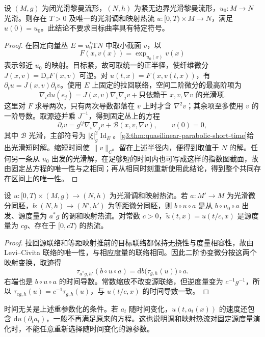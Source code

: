 \begin{corollary}\label{g3:cor:harmonic-heat-short-time}
	设 \((M,g)\) 为闭光滑黎曼流形，\((N,h)\) 为紧无边界光滑黎曼流形，\(u_0:M\to N\) 光滑。则存在 \(T>0\) 及唯一的光滑调和映射热流 \(u:[0,T)\times M\to N\)，满足 \(u(0)=u_0\)。此结论不要求目标曲率具有特定符号。
\end{corollary}
\begin{proof}
	在固定向量丛 \(E=u_0^*\mathrm TN\) 中取小截面 \(v\)，以
	\[
		F(x,v(x))=\exp_{u_0(x)}v(x)
	\]
	表示邻近 \(u_0\) 的映射。目标紧，故可取统一的正半径，使纤维微分 \(J(x,v)=\mathrm D_vF(x,v)\) 可逆。对 \(u(t,x)=F(x,v(t,x))\)，有 \(\partial_tu=J(x,v)\partial_tv\)。使用 \(E\) 上固定的拉回联络，空间二阶微分的最高阶项为
	\[
		\nabla_i\mathrm du(e_j)=J(x,v)\nabla_i\nabla_jv
		+\text{只依赖于 }x,v,\nabla v\text{ 的光滑项}.
	\]
	这里对 \(F\) 求导两次，只有两次导数都落在 \(v\) 上时才含 \(\nabla^2v\)；其余项至多使用 \(v\) 的一阶导数。取源迹并乘 \(J^{-1}\)，得到固定丛上的方程
	\[
		\partial_tv=g^{ij}\nabla_i\nabla_jv+\mathcal B(x,v,\nabla v),
		\qquad v(0)=0,
	\]
	其中 \(\mathcal B\) 光滑，主部符号为 \(|\xi|_g^2\operatorname{Id}_E\)。\cref{g3:thm:quasilinear-parabolic-short-time}给出光滑短时解。缩短时间使 \(\|v\|_{C^0}\) 留在上述半径内，便得到取值于 \(N\) 的解。任何另一条从 \(u_0\) 出发的光滑解，在足够短的时间内也可写成这样的指数图截面，故由固定丛方程的唯一性与之相同；再从相同时刻重新使用此结论，得到整个共同存在区间上的唯一性。
\end{proof}

\begin{proposition}\label{g3:prop:harmonic-heat-naturality}
	设 \(u:[0,T)\times(M,g)\to(N,h)\) 为光滑调和映射热流。若 \(a:M'\to M\) 为光滑微分同胚，\(b:(N,h)\to(N',h')\) 为等距微分同胚，则 \(b\circ u\circ a\) 是从 \(b\circ u_0\circ a\) 出发、源度量为 \(a^*g\) 的调和映射热流。对常数 \(c>0\)，\(\widetilde u(t,x)=u(t/c,x)\) 是源度量为 \(cg\)、存在于 \([0,cT)\) 的热流。
\end{proposition}
\begin{proof}
	拉回源联络和等距映射推前的目标联络都保持无挠性与度量相容性，故由 Levi--Civita 联络的唯一性，与相应度量的联络相同。因此二阶协变微分按这两个映射变换，取迹得
	\[
		\tau_{a^*g,h'}(b\circ u\circ a)
		=\mathrm db\bigl(\tau_{g,h}(u)\bigr)\circ a.
	\]
	右端也是 \(b\circ u\circ a\) 的时间导数。常数缩放不改变源联络，但逆度量变为 \(c^{-1}g^{-1}\)，所以 \(\tau_{cg,h}(u)=c^{-1}\tau_{g,h}(u)\)，与 \(u(t/c,x)\) 的时间导数一致。
\end{proof}

时间无关是上述重参数化的条件。若 \(a_t\) 随时间变化，\(u(t,a_t(x))\) 的速度还包含 \(\mathrm du(\partial_ta_t)\)，一般不再满足原来的方程。这也说明调和映射热流对固定源度量演化时，不能任意重新选择随时间变化的源参数。

